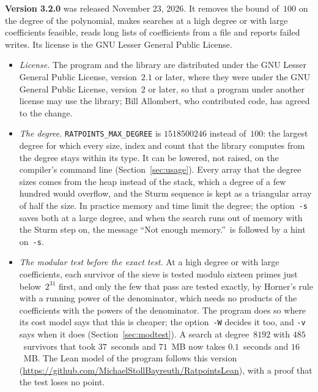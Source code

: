 \documentclass[12pt,a4paper,oneside]{amsart}
\begin{document}
\textbf{Version 3.2.0} was released November 23, 2026. It removes the bound
of~$100$ on the degree of the polynomial, makes searches at a high degree
or with large coefficients feasible, reads long lists of coefficients from
a file and reports failed writes. Its license is the GNU Lesser General
Public License.
\begin{itemize}
  \item \emph{License.} The program and the library are distributed under
        the GNU Lesser General Public License, version~$2.1$ or later,
        where they were under the GNU General Public License, version~$2$
        or later, so that a program under another license may use the
        library; Bill Allombert, who contributed code, has agreed to the
        change.
  \item \emph{The degree.} \texttt{RATPOINTS\_MAX\_DEGREE} is $1518500246$
        instead of~$100$: the largest degree for which every size, index
        and count that the library computes from the degree stays within
        its type. It can be lowered, not raised, on the compiler's command
        line (Section~\ref{sec:usage}). Every array that the degree sizes
        comes from the heap instead of the stack, which a degree of a few
        hundred would overflow, and the Sturm sequence is kept as a
        triangular array of half the size. In practice memory and time
        limit the degree; the option~\verb+-s+ saves both at a large
        degree, and when the search runs out of memory with the Sturm step
        on, the message ``Not enough memory.''\ is followed by a hint
        on~\verb+-s+.
  \item \emph{The modular test before the exact test.} At a high degree or
        with large coefficients, each survivor of the sieve is tested
        modulo sixteen primes just below~$2^{31}$ first, and only the few
        that pass are tested exactly, by Horner's rule with a running
        power of the denominator, which needs no products of the
        coefficients with the powers of the denominator. The program does
        so where its cost model says that this is cheaper; the
        option~\verb+-W+ decides it too, and \verb+-v+ says when it does
        (Section~\ref{sec:modtest}). A search at degree~$8192$ with
        $485$~survivors that took $37$~seconds and $71$~MB now takes
        $0.1$~seconds and $16$~MB. The
        Lean model of the program follows this version
        (\url{https://github.com/MichaelStollBayreuth/RatpointsLean}),
        with a proof that the test loses no point.

\end{itemize}
\end{document}
